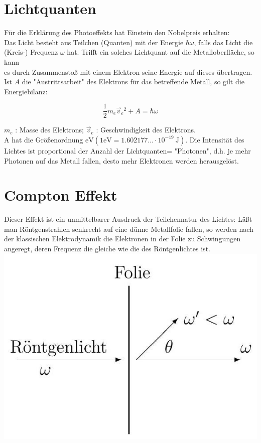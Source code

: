 \documentclass[10pt, letterpaper]{article}
\begin{document}
\section*{Lichtquanten}
Für die Erklärung des Photoeffekts hat Einstein den Nobelpreis erhalten:\\
Das Licht besteht aus Teilchen (Quanten) mit der Energie $\hbar \omega$, falls das Licht die (Kreis-) Frequenz $\omega$ hat. Trifft ein solches Lichtquant auf die Metalloberfläche, so kann\\
es durch Zusammenstoß mit einem Elektron seine Energie auf dieses übertragen. Ist $A$ die "Austrittsarbeit" des Elektrons für das betreffende Metall, so gilt die Energiebilanz:

$$
\frac{1}{2} m_{e} \vec{v}_{e}{ }^{2}+A=\hbar \omega
$$

$m_{e}$ : Masse des Elektrons; $\vec{v}_{e}$ : Geschwindigkeit des Elektrons.\\
A hat die Größenordnung $\mathrm{eV}\left(1 \mathrm{eV}=1.602177 \ldots \cdot 10^{-19} \mathrm{~J}\right)$. Die Intensität des Lichtes ist proportional der Anzahl der Lichtquanten= "Photonen", d.h. je mehr Photonen auf das Metall fallen, desto mehr Elektronen werden herausgelöst.

\section*{Compton Effekt}
Dieser Effekt ist ein unmittelbarer Ausdruck der Teilchennatur des Lichtes: Läßt man Röntgenstrahlen senkrecht auf eine dünne Metallfolie fallen, so werden nach der klassischen Elektrodynamik die Elektronen in der Folie zu Schwingungen angeregt, deren Frequenz die gleiche wie die des Röntgenlichtes ist.\\
\includegraphics[scale=0.2, center]{2025_05_21_7e716008973ee1b5e8beg-06}
\end{document}
